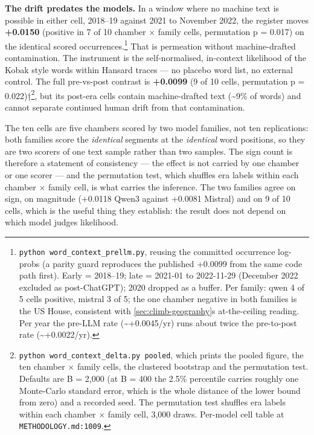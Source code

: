 \textbf{The drift predates the models.} In a window where no machine text is
possible in either cell, 2018--19 against 2021 to November 2022, the register
moves \textbf{+0.0150} (positive in 7 of 10 chamber \(\times\) family cells, permutation
p = 0.017) on the identical scored occurrences.\footnote{\texttt{python\ word\_\allowbreak{}context\_\allowbreak{}prellm.\allowbreak{}py}, reusing the committed occurrence
  log-probs (a parity guard reproduces the published +0.0099 from the same
  code path first). Early = 2018--19; late = 2021-01 to 2022-11-29
  (December 2022 excluded as post-ChatGPT); 2020 dropped as a buffer.
  Per family: qwen 4 of 5 cells positive, mistral 3 of 5; the one chamber
  negative in both families is the US House, consistent with \cref{sec:climb-geography}\textquotesingle s
  at-the-ceiling reading. Per year the pre-LLM rate (\textasciitilde+0.0045/yr) runs
  about twice the pre-to-post rate (\textasciitilde+0.0022/yr).} That is permeation
without machine-drafted contamination. The instrument is the self-normalised,
in-context likelihood of the Kobak style words within Hansard traces --- no
placebo word list, no external control. The full pre-vs-post contrast is
\textbf{+0.0099} (9 of 10 cells, permutation p = 0.022)†\footnote{\texttt{python\ word\_\allowbreak{}context\_\allowbreak{}delta.\allowbreak{}py\ pooled}, which prints the pooled figure,
  the ten chamber \(\times\) family cells, the clustered bootstrap and the permutation
  test. Defaults are B = 2,000 (at B = 400 the 2.5\%
  percentile carries roughly one Monte-Carlo standard error, which is the
  whole distance of the lower bound from zero) and a recorded seed. The
  permutation test shuffles era labels within each chamber \(\times\) family cell,
  3,000 draws. Per-model cell table at \texttt{METHODOLOGY.md:1009}.}, but its post-era
cells contain machine-drafted text (\textasciitilde9\% of words) and cannot separate continued
human drift from that contamination.

The ten cells are five chambers scored by two model families, not ten
replications: both families score the \emph{identical} segments at the \emph{identical}
word positions, so they are two scorers of one text sample rather than two
samples. The sign count is therefore a statement of consistency --- the effect is
not carried by one chamber or one scorer --- and the permutation test, which
shuffles era labels within each chamber \(\times\) family cell, is what carries the
inference. The two families agree on sign, on magnitude (+0.0118 Qwen3 against
+0.0081 Mistral) and on 9 of 10 cells, which is the useful thing they establish:
the result does not depend on which model judges likelihood.

